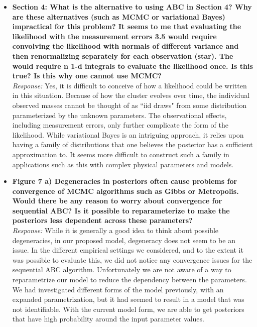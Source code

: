\documentclass[11pt, oneside]{article}   	%
\newcommand{\todo}[1]{{\color{red}[[\textbf{TODO: }#1]]}}
\begin{document}
\begin{itemize}
\item  {\bf Section 4: What is the alternative to using ABC in Section 4? Why are these alternatives (such as MCMC or variational Bayes) impractical for this problem? It seems to me that evaluating the likelihood with the measurement errors 3.5 would require convolving the likelihood with normals of different variance and then renormalizing separately for each observation (star). The would require n 1-d integrals to evaluate the likelihood once. Is this true? Is this why one cannot use MCMC?}\\
\noindent \emph{Response:} Yes, it is difficult to conceive of how a likelihood could be written in this situation. Because of how the
cluster evolves over time, the individual observed masses cannot
be thought of as ``iid draws" from some distribution parameterized by the unknown parameters. The observational effects, including measurement
errors, only further complicate the form of the likelihood. While variational Bayes is an intriguing approach, it relies upon having a family
of distributions that one believes the posterior has a sufficient approximation to. It seems more difficult to construct such a family in
applications such as this with complex physical parameters and models.

\bigskip

\item  {\bf Figure 7 a) Degeneracies in posteriors often cause problems for convergence of MCMC algorithms such as Gibbs or Metropolis. Would there be any reason to worry about convergence for sequential ABC? Is it possible to reparameterize to make the posteriors less dependent across these parameters?} \\
\noindent \emph{Response:}  While it is generally a good idea to think about possible degeneracies, in our proposed model, degeneracy does not seem to be an issue.  In the different empirical settings we considered, and to the extent it was possible to evaluate this, we did not notice any convergence issues for the sequential ABC algorithm.  Unfortunately we are not aware of a way to reparametrize our model to reduce the dependency between the parameters.  We had investigated different forms of the model previously, with an expanded parametrization, but it had seemed to result in a model that was not identifiable.  With the current model form, we are able to get posteriors that have high probability around the input parameter values.
\bigskip


\end{itemize}
\end{document}
